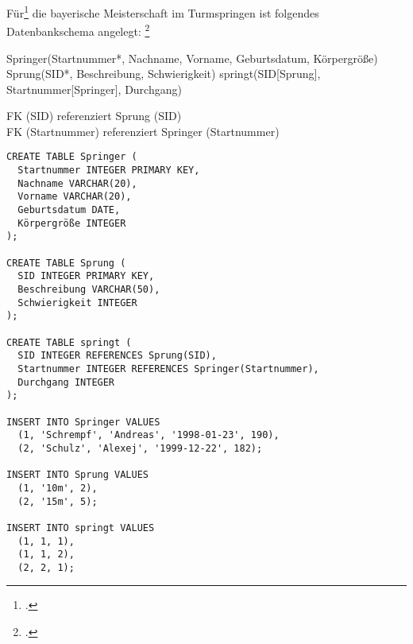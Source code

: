 \documentclass{bschlangaul-aufgabe}
\begin{document}

\noindent
Für\footcite[Thema 2 Teilaufgabe 2 Aufgabe
4]{examen:46116:2017:09} die bayerische Meisterschaft im Turmspringen
ist folgendes Datenbankschema angelegt:
\footcite{db:ab:2}

\begin{liRelationenSchemaFormat}
Springer(Startnummer*, Nachname, Vorname, Geburtsdatum, Körpergröße)
Sprung(SID*, Beschreibung, Schwierigkeit)
springt(SID[Sprung], Startnummer[Springer], Durchgang)
\end{liRelationenSchemaFormat}

\begin{bRelationenModell}



FK (SID) referenziert Sprung (SID)\\
FK (Startnummer) referenziert Springer (Startnummer)
\end{bRelationenModell}

\begin{bAdditum}[Übungsdatenbank]
\begin{verbatim}
CREATE TABLE Springer (
  Startnummer INTEGER PRIMARY KEY,
  Nachname VARCHAR(20),
  Vorname VARCHAR(20),
  Geburtsdatum DATE,
  Körpergröße INTEGER
);

CREATE TABLE Sprung (
  SID INTEGER PRIMARY KEY,
  Beschreibung VARCHAR(50),
  Schwierigkeit INTEGER
);

CREATE TABLE springt (
  SID INTEGER REFERENCES Sprung(SID),
  Startnummer INTEGER REFERENCES Springer(Startnummer),
  Durchgang INTEGER
);

INSERT INTO Springer VALUES
  (1, 'Schrempf', 'Andreas', '1998-01-23', 190),
  (2, 'Schulz', 'Alexej', '1999-12-22', 182);

INSERT INTO Sprung VALUES
  (1, '10m', 2),
  (2, '15m', 5);

INSERT INTO springt VALUES
  (1, 1, 1),
  (1, 1, 2),
  (2, 2, 1);
\end{verbatim}
\end{bAdditum}
\end{document}
